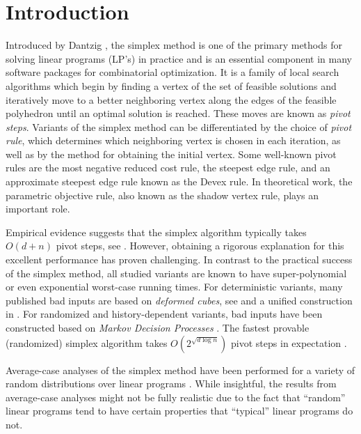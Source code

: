 \documentclass{article}\usepackage[a4paper,margin=20mm]{geometry}
\begin{document}



\section{Introduction}

Introduced by Dantzig \cite{dan51},
the simplex method is one of the primary methods
for solving linear programs (LP's) in practice and is an essential component in many software packages
for combinatorial optimization.
It is a family of local search algorithms which begin by finding a vertex of the set of feasible solutions
and iteratively move to a better neighboring vertex along
the edges of the feasible polyhedron until an optimal solution is reached. These moves are known as \emph{pivot steps}.
Variants of the simplex method can be differentiated by the choice of \emph{pivot rule},
which determines which neighboring vertex is chosen in each iteration,
as well as by the method for obtaining the initial vertex.
Some well-known pivot rules are the most negative reduced cost rule,
the steepest edge rule, and an approximate steepest edge rule known as the
Devex rule.  In theoretical work, the parametric objective rule, also known as
the shadow vertex rule, plays an important role.

Empirical evidence suggests that the simplex algorithm typically takes $O(d + n)$ pivot steps, see
\cite{sha87, andrei2004complexity, Goldfarb1994}.
However, obtaining a rigorous explanation for this excellent
performance has proven challenging.
In contrast to the practical success of the simplex method, all studied variants
are known to have super-polynomial or even exponential worst-case running times.
For deterministic variants, many published bad inputs are based on \emph{deformed cubes},
see \cite{km72, jer73, AC78, GS79, Mur80, gol76} and a unified construction
in \cite{jour/cm/AZ98}.
For randomized and history-dependent variants, bad inputs have been constructed
based on \emph{Markov Decision Processes}
\cite{k92, msw96, conf/stoc/FHZ11, conf/ipco/Friedmann11, hz15, disser2020exponential}.
The fastest provable (randomized) simplex algorithm takes
$O(2^{\sqrt{d\log n}})$ pivot steps in expectation \cite{k92, msw96, hz15}.

Average-case analyses of the simplex method have been performed for a variety of random distributions over linear programs
\cite{b82,b87,b99, jour/mapr/Smale83, report/Haimovich83, jour/mapr/Megiddo86, jour/jc/AKS87, jour/mapr/Todd86, jour/jacm/AM85}.
While insightful, the results from average-case analyses might not be fully realistic due to the fact that ``random''
linear programs tend to have certain properties that ``typical'' linear programs do not.
\end{document}
